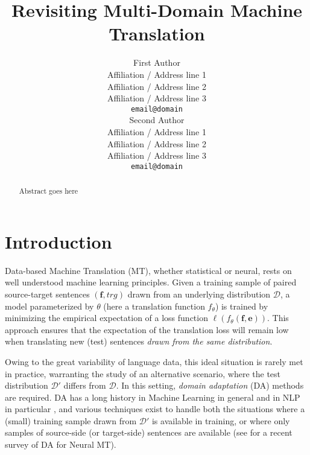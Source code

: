 \documentclass[11pt]{article}
\title{Revisiting Multi-Domain Machine Translation}
\author{First Author \\
  Affiliation / Address line 1 \\
  Affiliation / Address line 2 \\
  Affiliation / Address line 3 \\
  {\tt email@domain} \\\And
  Second Author \\
  Affiliation / Address line 1 \\
  Affiliation / Address line 2 \\
  Affiliation / Address line 3 \\
  {\tt email@domain} \\}
\date{}
\newcommand{\src}{\ensuremath{\mathbf{f}}} %
\newcommand{\trg}{\ensuremath{\mathbf{e}}} %
\begin{document}
\maketitle
\begin{abstract}
Abstract goes here
\end{abstract}

\section{Introduction}
\label{intro}

%
% 

Data-based Machine Translation (MT), whether statistical or neural, rests on well understood machine learning principles. Given a training sample of paired source-target sentences $(\src,trg)$ drawn from an underlying distribution $\mathcal{D}$, a model parameterized by $\theta$ (here a translation function $f_{\theta}$) is trained by minimizing the empirical expectation of a loss function $\ell(f_\theta(\src, \trg))$. This approach ensures that the expectation of the translation loss will remain low when translating new (test) sentences \emph{drawn from the same distribution}.

Owing to the great variability of language data, this ideal situation is rarely met in practice, warranting the study of an alternative scenario, where the test distribution $\mathcal{D'}$ differs from $\mathcal{D}$. In this setting, \emph{domain adaptation} (DA) methods are required. DA has a long history in Machine Learning in general \cite{Daume06domain} and in NLP in particular \cite{Blitzer07domain}, and various techniques exist to handle both the situations where a (small) training sample drawn from $\mathcal{D'}$ is available in training, or where only samples of source-side (or target-side) sentences are available (see \cite{Chu18asurvey} for a recent survey of DA for Neural MT).
\end{document}
